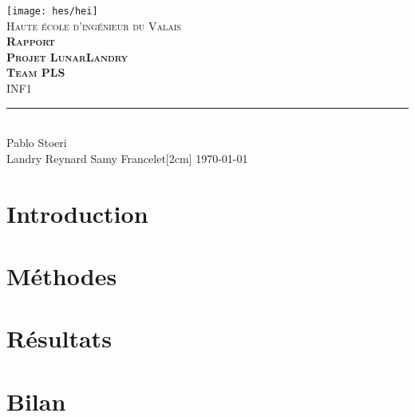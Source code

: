\documentclass[11pt,titlepage]{report}
\def\Team{Team PLS}
\def\Autora{Pablo Stoeri}
\def\Autorb{Landry Reynard}
\def\Autorc{Samy Francelet}
\begin{document}
\begin{titlepage}
	\centering
    \texttt{[image: hes/hei]}\\[1cm] 	%
    \textsc{\LARGE Haute école d'ingénieur du Valais}\\ \vspace{\fill}
    \textbf{\textsc{\fontsize{50}{50}\selectfont Rapport}}\\[0.8cm]
		\textbf{\textsc{\fontsize{30}{30}\selectfont Projet LunarLandry}}\\[0.8cm]
		\textbf{\textsc{\fontsize{20}{20}\selectfont \Team }}\\ \vspace{\fill}
	\textsc{\LARGE INF1}\\[0.4cm]
	\rule{\linewidth}{0.2 mm} \\[0.5 cm]
		\Autora \\
		\Autorb
		\Autorc [2cm]
	\today
\end{titlepage}
\restoregeometry

\tableofcontents

\chapter{Introduction}


\chapter{Méthodes}


\chapter{Résultats}


\chapter{Bilan}



\end{document}
